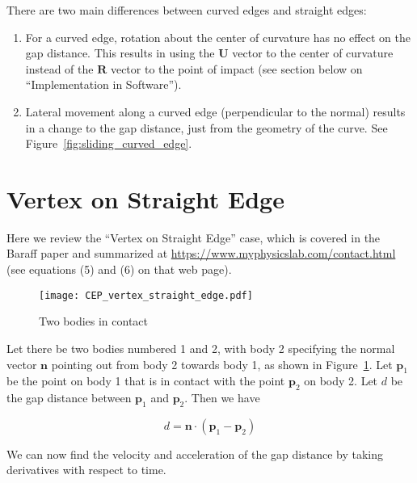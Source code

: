 \documentclass[final]{article}
\begin{document}
There are two main differences between curved edges and straight edges:

\begin{enumerate}

  \item For a curved edge, rotation about the center of curvature has no effect on the
  gap distance. This results in using the $\mathbf{U}$ vector to the center of curvature
  instead of the $\mathbf{R}$ vector to the point of impact (see section below on
  ``Implementation in Software'').

  \item Lateral movement along a curved edge (perpendicular to the normal) results in a
  change to the gap distance, just from the geometry of the curve. See
  Figure~\ref{fig:sliding_curved_edge}.

\end{enumerate}



\section{Vertex on Straight Edge}

Here we review the ``Vertex on Straight Edge'' case, which is covered in the Baraff
paper \cite{dB94} and summarized at \url{https://www.myphysicslab.com/contact.html} (see
equations (5) and (6) on that web page).

\begin{figure}[ht]
    \centering
    \texttt{[image: CEP\_vertex\_straight\_edge.pdf]}
    \caption{Two bodies in contact}
    \label{fig:two_bodies_in_contact}
\end{figure}

Let there be two bodies numbered 1 and 2, with body 2 specifying the normal vector
$\mathbf{n}$ pointing out from body 2 towards body 1, as shown in
Figure~\ref{fig:two_bodies_in_contact}. Let $\mathbf{p}_1$ be the point on body 1 that
is in contact with the point $\mathbf{p}_2$ on body 2. Let $d$ be the gap distance
between $\mathbf{p}_1$ and $\mathbf{p}_2$. Then we have

\begin{equation}\label{straight_vertex}
  d = \mathbf{n} \cdot (\mathbf{p}_1 - \mathbf{p}_2)
\end{equation}

We can now find the velocity and acceleration of the gap distance by taking derivatives
with respect to time.
\end{document}
